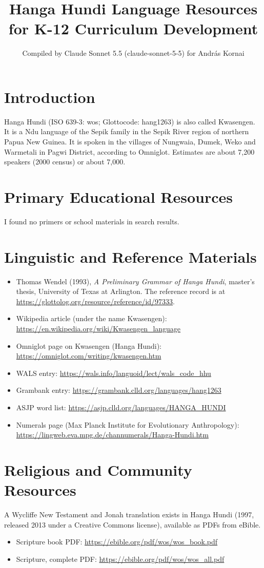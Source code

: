 \documentclass[12pt]{article}
\title{Hanga Hundi Language Resources for K-12 Curriculum Development}
\author{Compiled by Claude Sonnet 5.5 (claude-sonnet-5-5) for Andr\'as Kornai}
\date{}
\begin{document}
\maketitle

\section{Introduction}
Hanga Hundi (ISO 639-3: wos; Glottocode: hang1263) is also called Kwasengen. It is a Ndu language of the Sepik family in the Sepik River region of northern Papua New Guinea. It is spoken in the villages of Nungwaia, Dumek, Weko and Warmetali in Pagwi District, according to Omniglot. Estimates are about 7,200 speakers (2000 census) or about 7,000.

\section{Primary Educational Resources}
I found no primers or school materials in search results.

\section{Linguistic and Reference Materials}
\begin{itemize}
\item Thomas Wendel (1993), \emph{A Preliminary Grammar of Hanga Hundi}, master's thesis, University of Texas at Arlington. The reference record is at \url{https://glottolog.org/resource/reference/id/97333}.
\item Wikipedia article (under the name Kwasengen): \url{https://en.wikipedia.org/wiki/Kwasengen_language}
\item Omniglot page on Kwasengen (Hanga Hundi): \url{https://omniglot.com/writing/kwasengen.htm}
\item WALS entry: \url{https://wals.info/languoid/lect/wals_code_hhu}
\item Grambank entry: \url{https://grambank.clld.org/languages/hang1263}
\item ASJP word list: \url{https://asjp.clld.org/languages/HANGA_HUNDI}
\item Numerals page (Max Planck Institute for Evolutionary Anthropology): \url{https://lingweb.eva.mpg.de/channumerals/Hanga-Hundi.htm}
\end{itemize}

\section{Religious and Community Resources}
A Wycliffe New Testament and Jonah translation exists in Hanga Hundi (1997, released 2013 under a Creative Commons license), available as PDFs from eBible.
\begin{itemize}
\item Scripture book PDF: \url{https://ebible.org/pdf/wos/wos_book.pdf}
\item Scripture, complete PDF: \url{https://ebible.org/pdf/wos/wos_all.pdf}
\end{itemize}
\end{document}
